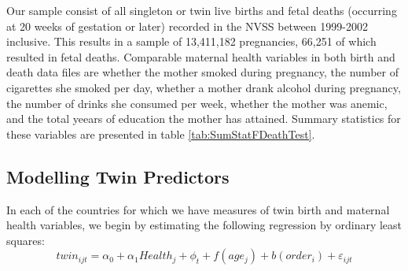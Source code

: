 \documentclass{nature}
\begin{document}
\begin{linenumbers}
Our sample consist of all singleton or twin live births and fetal deaths (occurring at 20 weeks of gestation or later) recorded in the NVSS between 1999-2002 inclusive.  This results in a sample of 13,411,182 pregnancies, 66,251 of which resulted in fetal deaths.  Comparable maternal health variables in both birth and death data files are whether the mother smoked during pregnancy, the number of cigarettes she smoked per day, whether a mother drank alcohol during pregnancy, the number of drinks she consumed per week, whether the mother was anemic, and the total yeears of education the mother has attained.  Summary statistics for these variables are presented in table \ref{tab:SumStatFDeathTest}.

\subsection{Modelling Twin Predictors}
In each of the countries for which we have measures of twin birth and maternal health variables, we begin by estimating the following regression by ordinary least squares:
\begin{equation}
  twin_{ijt}=\alpha_0 + \alpha_1 Health_j + \phi_t + f(age_j) + b(order_i) + \varepsilon_{ijt}
\end{equation}

\end{linenumbers}
\end{document}
